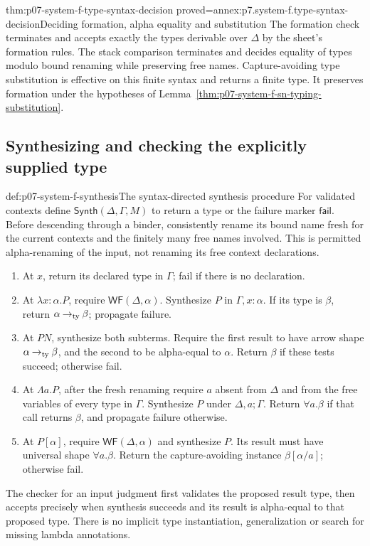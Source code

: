 \begin{hblemma}{thm:p07-system-f-type-syntax-decision}
 {proved=annex:p7.system-f.type-syntax-decision}{Deciding formation, alpha equality and substitution}
The formation check terminates and accepts exactly the types derivable
over \(\Delta\) by the sheet's formation rules. The stack comparison
terminates and decides equality of types modulo bound renaming while
preserving free names. Capture-avoiding type substitution is effective
on this finite syntax and returns a finite type. It preserves formation
under the hypotheses of Lemma~\ref{thm:p07-system-f-sn-typing-substitution}.
\end{hblemma}

\subsection{Synthesizing and checking the explicitly supplied type}
\label{sec:p07-system-f-checking-algorithm}

\begin{hbmethod}{def:p07-system-f-synthesis}{The syntax-directed synthesis procedure}
For validated contexts define \(\mathsf{Synth}(\Delta,\Gamma,M)\)
to return a type or the failure marker \(\mathsf{fail}\).
Before descending through a binder, consistently rename its bound name
fresh for the current contexts and the finitely many free names involved.
This is permitted alpha-renaming of the input, not renaming its free
context declarations.
\begin{enumerate}
\item At \(x\), return its declared type in \(\Gamma\); fail if
      there is no declaration.
\item At \(\lambda x{:}\alpha.P\), require
      \(\mathsf{WF}(\Delta,\alpha)\). Synthesize \(P\) in
      \(\Gamma,x:\alpha\). If its type is \(\beta\), return
      \(\alpha\mathbin{\to_{\rm ty}}\beta\); propagate failure.
\item At \(PN\), synthesize both subterms. Require the first result
      to have arrow shape \(\alpha\mathbin{\to_{\rm ty}}\beta\),
      and the second to be alpha-equal to \(\alpha\). Return \(\beta\)
      if these tests succeed; otherwise fail.
\item At \(\Lambda a.P\), after the fresh renaming require \(a\)
      absent from \(\Delta\) and from the free variables of every type
      in \(\Gamma\). Synthesize \(P\) under \(\Delta,a;\Gamma\).
      Return \(\forall a.\beta\) if that call returns \(\beta\),
      and propagate failure otherwise.
\item At \(P[\alpha]\), require \(\mathsf{WF}(\Delta,\alpha)\)
      and synthesize \(P\). Its result must have universal shape
      \(\forall a.\beta\). Return the capture-avoiding instance
      \(\beta[\alpha/a]\); otherwise fail.
\end{enumerate}
The checker for an input judgment first validates the proposed result
type, then accepts precisely when synthesis succeeds and its result is
alpha-equal to that proposed type. There is no implicit type instantiation,
generalization or search for missing lambda annotations.
\end{hbmethod}

